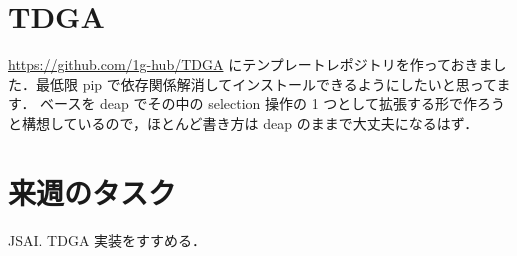 \documentclass[onecolumn]{ujarticle}   %
\begin{document}
	\section{TDGA}
	\url{https://github.com/1g-hub/TDGA} にテンプレートレポジトリを作っておきました．最低限 pip で依存関係解消してインストールできるようにしたいと思ってます．
	ベースを deap でその中の selection 操作の 1 つとして拡張する形で作ろうと構想しているので，ほとんど書き方は deap のままで大丈夫になるはず．

	\section{来週のタスク}
	JSAI. TDGA 実装をすすめる．

	
	
\end{document}
